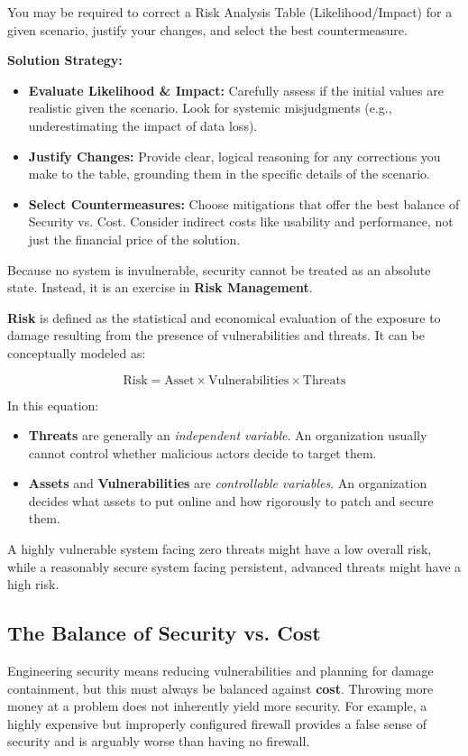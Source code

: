 \begin{tcolorbox}[colback=blue!5!white,colframe=blue!75!black,title=Exam Insight]
You may be required to correct a Risk Analysis Table (Likelihood/Impact) for a given scenario, justify your changes, and select the best countermeasure.

\textbf{Solution Strategy:}
\begin{itemize}
    \item \textbf{Evaluate Likelihood \& Impact:} Carefully assess if the initial values are realistic given the scenario. Look for systemic misjudgments (e.g., underestimating the impact of data loss).
    \item \textbf{Justify Changes:} Provide clear, logical reasoning for any corrections you make to the table, grounding them in the specific details of the scenario.
    \item \textbf{Select Countermeasures:} Choose mitigations that offer the best balance of Security vs. Cost. Consider indirect costs like usability and performance, not just the financial price of the solution.
\end{itemize}
\end{tcolorbox}
Because no system is invulnerable, security cannot be treated as an absolute state. Instead, it is an exercise in \textbf{Risk Management}. 

\textbf{Risk} is defined as the statistical and economical evaluation of the exposure to damage resulting from the presence of vulnerabilities and threats. It can be conceptually modeled as:

\[ \text{Risk} = \text{Asset} \times \text{Vulnerabilities} \times \text{Threats} \]

In this equation:
\begin{itemize}
    \item \textbf{Threats} are generally an \textit{independent variable}. An organization usually cannot control whether malicious actors decide to target them.
    \item \textbf{Assets} and \textbf{Vulnerabilities} are \textit{controllable variables}. An organization decides what assets to put online and how rigorously to patch and secure them.
\end{itemize}

A highly vulnerable system facing zero threats might have a low overall risk, while a reasonably secure system facing persistent, advanced threats might have a high risk.

\subsection{The Balance of Security vs. Cost}
Engineering security means reducing vulnerabilities and planning for damage containment, but this must always be balanced against \textbf{cost}. Throwing more money at a problem does not inherently yield more security. For example, a highly expensive but improperly configured firewall provides a false sense of security and is arguably worse than having no firewall.

